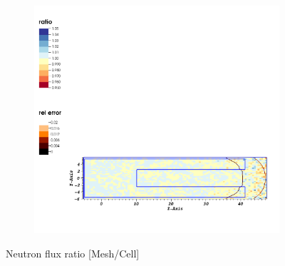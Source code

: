 \begin{figure}
\begin{subfigure}{0.1\textwidth}
    \end{subfigure}
    \begin{subfigure}{0.79\textwidth}
        \centering
        \includegraphics[scale=0.5, trim={4cm 2cm 1cm 22cm}, clip]{figs/ratio_nflux.png}
    \end{subfigure}
    \caption{Neutron flux ratio [Mesh/Cell]}
    \label{fig:n_ratio_larger}
\end{figure}


